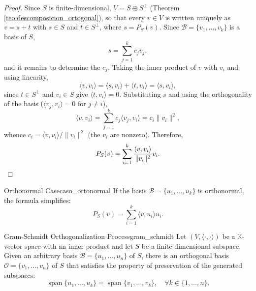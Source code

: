 \documentclass[11pt, a4paper]{article}
\begin{document}
\begin{proof}
Since $S$ is finite-dimensional, $V = S \oplus S^\perp$ (Theorem \ref{teo:descomposicion_ortogonal}), so that every $v \in V$ is written uniquely as $v = s + t$ with $s \in S$ and $t \in S^\perp$, where $s = P_S(v)$. Since $\mathcal{B} = \{v_1, \dots, v_k\}$ is a basis of $S$,
\[
s = \sum_{j=1}^{k} c_j v_j,
\]
and it remains to determine the $c_j$. Taking the inner product of $v$ with $v_i$ and using linearity,
\[
\langle v, v_i \rangle = \langle s, v_i \rangle + \langle t, v_i \rangle = \langle s, v_i \rangle,
\]
since $t \in S^\perp$ and $v_i \in S$ give $\langle t, v_i \rangle = 0$. Substituting $s$ and using the orthogonality of the basis ($\langle v_j, v_i \rangle = 0$ for $j \neq i$),
\[
\langle v, v_i \rangle = \sum_{j=1}^{k} c_j \langle v_j, v_i \rangle = c_i \|v_i\|^2,
\]
whence $c_i = \langle v, v_i \rangle / \|v_i\|^2$ (the $v_i$ are nonzero). Therefore,
\[
P_S(v) = \sum_{i=1}^{k} \frac{\langle v, v_i \rangle}{\|v_i\|^2} v_i. \qedhere
\]
\end{proof}

\begin{corolario}{Orthonormal Case}{caso_ortonormal}
If the basis $\mathcal{B} = \{u_1, \dots, u_k\}$ is orthonormal, the formula simplifies:
\[
P_S(v) = \sum_{i=1}^{k} \langle v, u_i \rangle u_i.
\]
\end{corolario}

\begin{teorema}{Gram-Schmidt Orthogonalization Process}{gram_schmidt}
Let $(V, \langle \cdot, \cdot \rangle)$ be a $\mathbb{K}$-vector space with an inner product and let $S$ be a finite-dimensional subspace.
Given an arbitrary basis $\mathcal{B} = \{u_1, \dots, u_n\}$ of $S$, there is an orthogonal basis $\mathcal{O} = \{v_1, \dots, v_n\}$ of $S$ that satisfies the property of preservation of the generated subspaces:
\[
\operatorname{span}\{u_1, \dots, u_k\} = \operatorname{span}\{v_1, \dots, v_k\}, \quad \forall k \in \{1, \dots, n\}.
\]
\end{teorema}
\end{document}
